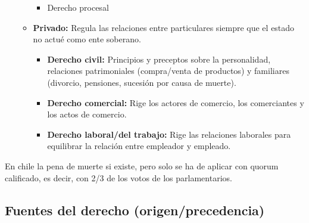 \documentclass{templateNote}
\begin{document}
\begin{itemize}
\begin{itemize}
\begin{itemize}
            \item Derecho procesal
        \end{itemize}
        \item \textbf{Privado:} Regula las relaciones entre particulares siempre que el estado no actué como ente soberano.
        \begin{itemize}
            \item \textbf{Derecho civil:} Principios y preceptos sobre la personalidad, relaciones patrimoniales (compra/venta de productos) y familiares (divorcio, pensiones, sucesión por causa de muerte).
            \item \textbf{Derecho comercial:} Rige los actores de comercio, los comerciantes y los actos de comercio.
            \item \textbf{Derecho laboral/del trabajo:} Rige las relaciones laborales para equilibrar la relación entre empleador y empleado.
        \end{itemize}
    \end{itemize}
\end{itemize}

\begin{tcolorbox}[colback=red!5!white,colframe=red!75!black]
    En chile la pena de muerte si existe, pero solo se ha de aplicar con quorum calificado, es decir, con 2/3 de los votos de los parlamentarios.
\end{tcolorbox}

\subsection*{Fuentes del derecho (origen/precedencia)}
\end{document}
